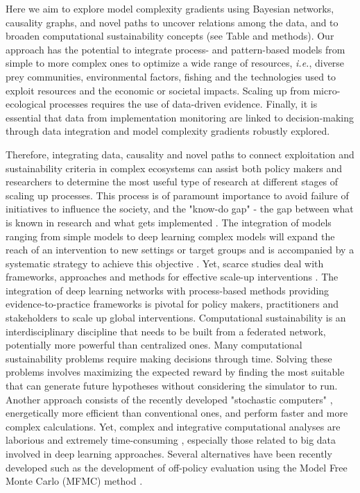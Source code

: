 \documentclass[12pt,a4paper]{article}
\begin{document}
Here we aim to explore model complexity gradients using Bayesian networks, causality graphs, and novel paths to uncover relations among the data, and to broaden computational sustainability concepts (see Table and methods). Our approach has the potential to integrate process- and pattern-based models from simple to more complex ones to optimize a wide range of resources, {\it i.e.}, diverse prey communities, environmental factors, fishing and the technologies used to exploit resources and the economic or societal impacts. Scaling up from micro-ecological processes requires the use of data-driven evidence. Finally, it is essential that data from implementation monitoring are linked to decision-making through data integration and model complexity gradients robustly explored. 

Therefore, integrating data, causality and novel paths to connect exploitation and sustainability criteria in complex ecosystems can assist both policy makers and researchers to determine the most useful type of research at different stages of scaling up processes. This process is of paramount importance to avoid failure of initiatives to influence the society, and the "know-do gap" - the gap between what is known in research and what gets implemented \citep{catford2009advancing}. The integration of models ranging from simple models to deep learning complex models will expand the reach of an intervention to new settings or target groups and is accompanied by a systematic strategy to achieve this objective \citep{milat2014increasing}. Yet, scarce studies deal with frameworks, approaches and methods for effective scale-up interventions \citep{wigboldus2013towards, yamey2012barriers}. The integration of deep learning networks with process-based methods providing evidence-to-practice frameworks is pivotal for policy makers, practitioners and stakeholders to scale up global interventions. Computational sustainability is an interdisciplinary discipline that needs to be built from a federated network, potentially more powerful than centralized ones. Many computational sustainability problems require making decisions through time. Solving these problems involves maximizing the expected reward by finding the most suitable that can generate future hypotheses without considering the simulator to run. Another approach consists of the recently developed "stochastic computers" \citep{borders2019integer}, energetically more efficient than conventional ones, and perform faster and more complex calculations. Yet, complex and integrative computational analyses are laborious and extremely time-consuming \citep{rodrigues2014integrative}, especially those related to big data involved in deep learning approaches. Several alternatives have been recently developed such as the development of off-policy evaluation using the Model Free Monte Carlo (MFMC) method \citep{fonteneau2010model}. 
\end{document}
